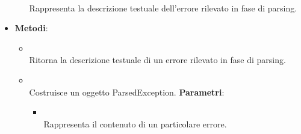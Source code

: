 \begin{itemize}
\begin{itemize}
\\ Rappresenta la descrizione testuale dell'errore rilevato in fase di parsing.
\end{itemize}
\item \textbf{Metodi}:
\begin{itemize}
\item {}
\\ Ritorna la descrizione testuale di un errore rilevato in fase di parsing.
\item {}
\\ Costruisce un oggetto ParsedException.
\textbf{Parametri}:
\begin{itemize}
\item {}
\\ Rappresenta il contenuto di un particolare errore.
\end{itemize}
\end{itemize}
\end{itemize}

